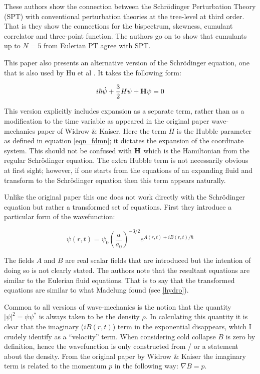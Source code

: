 These authors show the connection between the Schr\"odinger Perturbation Theory (SPT) with conventional perturbation theories at the tree-level at third order. That is they show the connections for the bispectrum, skewness, cumulant correlator and three-point function. The authors go on to show that cumulants up to $N=5$ from Eulerian PT agree with SPT.

This paper also presents an alternative version of the Schr\"odinger equation, one that is also used by Hu et al \citep{bib_whu}. It takes the following form:

\begin{equation}
i\hbar\dot{\psi} + \frac{3}{2}H\psi + {\bf H}\psi = 0
\end{equation}

\noindent This version explicitly includes expansion as a separate term, rather than as a modification to the time variable as appeared in the original paper wave-mechanics paper of Widrow \& Kaiser. Here the term $H$ is the Hubble parameter as defined in equation \ref{eqn_fdmn}; it dictates the expansion of the coordinate system. This should not be confused with ${\bf H}$ which is the Hamiltonian from the regular Schr\"odinger equation. The extra Hubble term is not necessarily obvious at first sight; however, if one starts from the equations of an expanding fluid and transform to the Schr\"odinger equation then this term appears naturally.

Unlike the original paper this one does not work directly with the Schr\"odinger equation but rather a transformed set of equations. First they introduce a particular form of the wavefunction:

\begin{equation}
\psi(r,t) = \psi_0 \left(\frac{a}{a_0}\right)^{-3/2} e^{A(r,t) + i B(r,t)/\hbar}
\end{equation}

\noindent The fields $A$ and $B$ are real scalar fields that are introduced but the intention of doing so is not clearly stated. The authors note that the resultant equations are similar to the Eulerian fluid equations. That is to say that the transformed equations are similar to what Madelung found (see \ref{hydro}).

Common to all versions of wave-mechanics is the notion that the quantity $|\psi|^2 = \psi\psi^*$ is always taken to be the density $\rho$. In calculating this quantity it is clear that the imaginary ($i B(r,t)$) term in the exponential disappears, which I crudely identify as a ``velocity'' term. When considering cold collapse $B$ is zero by definition, hence the wavefunction is only constructed from / or a statement about the density. From the original paper by Widrow \& Kaiser the imaginary term is related to the momentum $p$ in the following way: $\nabla B = p$.

